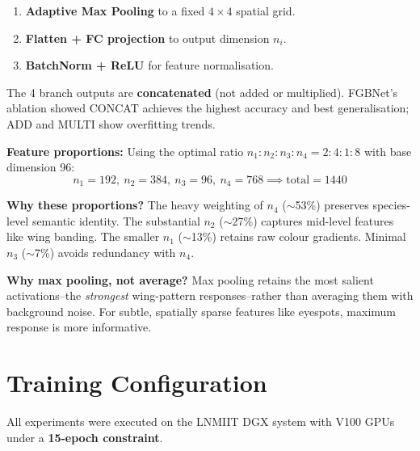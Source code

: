 \documentclass[10pt, twocolumn]{article}
\begin{document}
\begin{enumerate}[leftmargin=*, topsep=2pt, itemsep=1pt]
    \item \textbf{Adaptive Max Pooling} to a fixed $4\times4$ spatial grid.
    \item \textbf{Flatten + FC projection} to output dimension $n_i$.
    \item \textbf{BatchNorm + ReLU} for feature normalisation.
\end{enumerate}

The 4 branch outputs are \textbf{concatenated} (not added or multiplied). FGBNet's ablation showed CONCAT achieves the highest accuracy and best generalisation; ADD and MULTI show overfitting trends.

\textbf{Feature proportions:} Using the optimal ratio $n_1\!:\!n_2\!:\!n_3\!:\!n_4 = 2\!:\!4\!:\!1\!:\!8$ with base dimension 96:
\vspace{-0.1cm}
$$n_1=192,\ n_2=384,\ n_3=96,\ n_4=768 \implies \text{total} = 1440$$

\textbf{Why these proportions?} The heavy weighting of $n_4$ ($\sim$53\%) preserves species-level semantic identity. The substantial $n_2$ ($\sim$27\%) captures mid-level features like wing banding. The smaller $n_1$ ($\sim$13\%) retains raw colour gradients. Minimal $n_3$ ($\sim$7\%) avoids redundancy with $n_4$.

\textbf{Why max pooling, not average?} Max pooling retains the most salient activations--the \emph{strongest} wing-pattern responses--rather than averaging them with background noise. For subtle, spatially sparse features like eyespots, maximum response is more informative.

\section{Training Configuration}
\label{sec:training}

All experiments were executed on the LNMIIT DGX system with V100 GPUs under a \textbf{15-epoch constraint}.
\end{document}
